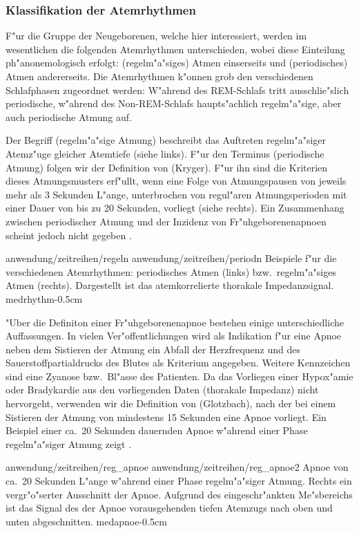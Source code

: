\subsubsection{Klassifikation der Atemrhythmen}
F"ur die Gruppe der Neugeborenen, welche hier interessiert, werden im wesentlichen die
folgenden Atemrhythmen unterschieden, wobei diese Einteilung ph"anonemologisch erfolgt:
\begriff(regelm"a"siges) Atmen einserseits und \begriff(periodisches) Atmen andererseits.
Die Atemrhythmen k"onnen grob den verschiedenen Schlafphasen zugeordnet werden: W"ahrend
des REM-Schlafs tritt ausschlie"slich periodische, w"ahrend des Non-REM-Schlafs
haupts"achlich regelm"a"sige, aber auch periodische Atmung auf.

Der Begriff \begriff(regelm"a"sige Atmung) beschreibt das Auftreten regelm"a"siger
Atemz"uge gleicher Atemtiefe (siehe  links). F"ur den Terminus
\begriff(periodische Atmung) folgen wir der Definition von \autor(Kryger). F"ur ihn sind
die Kriterien dieses Atmungsmusters erf"ullt, wenn eine Folge von Atmungspausen von
jeweils mehr als 3 Sekunden L"ange, unterbrochen von regul"aren Atmungsperioden mit einer
Dauer von bis zu 20 Sekunden, vorliegt (siehe  rechts). Ein Zusammenhang
zwischen periodischer Atmung und der Inzidenz von Fr"uhgeborenenapnoen scheint jedoch
nicht gegeben \cite{Hoch96}.

\epsfigdouble
{anwendung/zeitreihen/regeln}
{anwendung/zeitreihen/periodn}
{Beispiele f"ur die verschiedenen Atemrhythmen: periodisches Atmen (links) bzw.\  
  regelm"a"siges Atmen (rechts). Dargestellt ist das atemkorrelierte thorakale
  Impedanzsignal.  }{medrhythm}{-0.5cm}

"Uber die Definiton einer Fr"uhgeborenenapnoe bestehen einige unterschiedliche
Auffassungen. In vielen Ver"offentlichungen wird als Indikation f"ur eine Apnoe neben dem Sistieren der
Atmung  ein Abfall der Herzfrequenz und des Sauerstoffpartialdrucks des Blutes als
Kriterium angegeben\cite{Poets93}. Weitere Kennzeichen sind eine Zyanose bzw.\  Bl"asse
des Patienten. Da das Vorliegen einer Hypox"amie oder Bradykardie aus den vorliegenden
Daten (thorakale Impedanz) nicht hervorgeht, verwenden wir die Definition von
\autor(Glotzbach), nach der bei einem Sistieren der Atmung von mindestens 15 Sekunden eine 
Apnoe vorliegt.  Ein Beispiel einer ca.\ 20 Sekunden dauernden Apnoe w"ahrend einer Phase
regelm"a"siger Atmung zeigt \psref{medapnoe}.

\epsfigdouble
{anwendung/zeitreihen/reg_apnoe}
{anwendung/zeitreihen/reg_apnoe2}
{ Apnoe von ca.\  20 Sekunden L"ange w"ahrend einer Phase regelm"a"siger Atmung. Rechts
  ein vergr"o"serter Ausschnitt der Apnoe. Aufgrund des eingeschr"ankten Me"sbereichs ist
  das Signal des der Apnoe vorausgehenden tiefen Atemzugs nach oben und unten abgeschnitten.
}{medapnoe}{-0.5cm}


